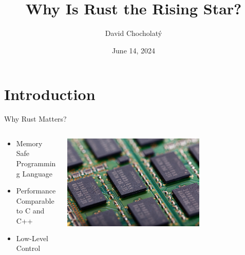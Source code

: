 \documentclass[10pt,aspectratio=169]{beamer}
\title{Why Is Rust the Rising Star?}
\author{David Chocholatý}
\institute{Brno University of Technology}
\date{June 14, 2024}
\begin{document}
\maketitle


\section[Why Rust Matters?]{Introduction}

\begin{frame}{Why Rust Matters?}
\begin{columns}
\begin{column}{0.5\textwidth}
    \begin{itemize}
    \setlength\itemsep{1em}
    \item Memory Safe Programming Language
    \pause
    \item Performance Comparable to C and C++
    \pause
    \item Low-Level Control
    \end{itemize}
\end{column}
\begin{column}{0.5\textwidth}  %
    \onslide
    \begin{center}
     \includegraphics[width=0.675\textwidth]{img/board-22098_1280.jpg}
     \end{center}
\end{column}
\end{columns}
\end{frame}
\end{document}
